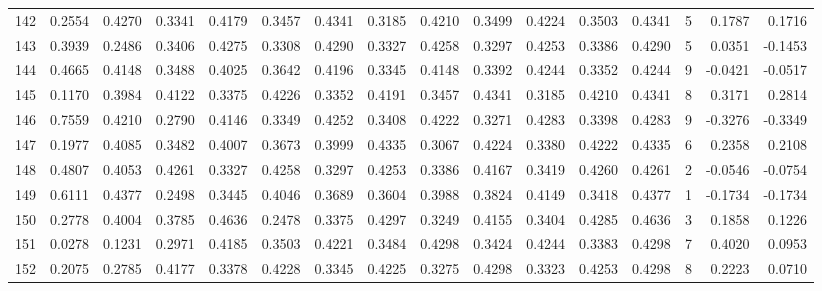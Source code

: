 \begin{tabular}{lrrrrrrrrrrrrrrr}
142 &      0.2554 &  0.4270 &  0.3341 &  0.4179 &  0.3457 &  0.4341 &  0.3185 &  0.4210 &  0.3499 &  0.4224 &   0.3503 &     0.4341 &      5 &                    0.1787 &                     0.1716 \\
143 &      0.3939 &  0.2486 &  0.3406 &  0.4275 &  0.3308 &  0.4290 &  0.3327 &  0.4258 &  0.3297 &  0.4253 &   0.3386 &     0.4290 &      5 &                    0.0351 &                    -0.1453 \\
144 &      0.4665 &  0.4148 &  0.3488 &  0.4025 &  0.3642 &  0.4196 &  0.3345 &  0.4148 &  0.3392 &  0.4244 &   0.3352 &     0.4244 &      9 &                   -0.0421 &                    -0.0517 \\
145 &      0.1170 &  0.3984 &  0.4122 &  0.3375 &  0.4226 &  0.3352 &  0.4191 &  0.3457 &  0.4341 &  0.3185 &   0.4210 &     0.4341 &      8 &                    0.3171 &                     0.2814 \\
146 &      0.7559 &  0.4210 &  0.2790 &  0.4146 &  0.3349 &  0.4252 &  0.3408 &  0.4222 &  0.3271 &  0.4283 &   0.3398 &     0.4283 &      9 &                   -0.3276 &                    -0.3349 \\
147 &      0.1977 &  0.4085 &  0.3482 &  0.4007 &  0.3673 &  0.3999 &  0.4335 &  0.3067 &  0.4224 &  0.3380 &   0.4222 &     0.4335 &      6 &                    0.2358 &                     0.2108 \\
148 &      0.4807 &  0.4053 &  0.4261 &  0.3327 &  0.4258 &  0.3297 &  0.4253 &  0.3386 &  0.4167 &  0.3419 &   0.4260 &     0.4261 &      2 &                   -0.0546 &                    -0.0754 \\
149 &      0.6111 &  0.4377 &  0.2498 &  0.3445 &  0.4046 &  0.3689 &  0.3604 &  0.3988 &  0.3824 &  0.4149 &   0.3418 &     0.4377 &      1 &                   -0.1734 &                    -0.1734 \\
150 &      0.2778 &  0.4004 &  0.3785 &  0.4636 &  0.2478 &  0.3375 &  0.4297 &  0.3249 &  0.4155 &  0.3404 &   0.4285 &     0.4636 &      3 &                    0.1858 &                     0.1226 \\
151 &      0.0278 &  0.1231 &  0.2971 &  0.4185 &  0.3503 &  0.4221 &  0.3484 &  0.4298 &  0.3424 &  0.4244 &   0.3383 &     0.4298 &      7 &                    0.4020 &                     0.0953 \\
152 &      0.2075 &  0.2785 &  0.4177 &  0.3378 &  0.4228 &  0.3345 &  0.4225 &  0.3275 &  0.4298 &  0.3323 &   0.4253 &     0.4298 &      8 &                    0.2223 &                     0.0710 \\

\end{tabular}
